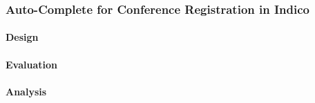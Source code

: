 \subsubsection{Auto-Complete for Conference Registration in Indico}

\paragraph{Design}
\paragraph{Evaluation}
\paragraph{Analysis}

\subsection{}